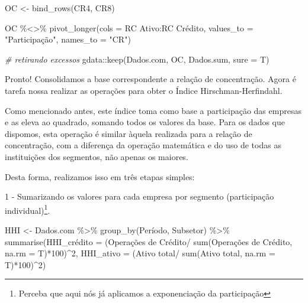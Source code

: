 \documentclass[
]{article}
\newenvironment{Shaded}{\begin{snugshade}}{\end{snugshade}}
\newcommand{\AttributeTok}[1]{\textcolor[rgb]{0.77,0.63,0.00}{#1}}
\newcommand{\CommentTok}[1]{\textcolor[rgb]{0.56,0.35,0.01}{\textit{#1}}}
\newcommand{\DecValTok}[1]{\textcolor[rgb]{0.00,0.00,0.81}{#1}}
\newcommand{\FunctionTok}[1]{\textcolor[rgb]{0.00,0.00,0.00}{#1}}
\newcommand{\NormalTok}[1]{#1}
\newcommand{\OtherTok}[1]{\textcolor[rgb]{0.56,0.35,0.01}{#1}}
\newcommand{\SpecialCharTok}[1]{\textcolor[rgb]{0.00,0.00,0.00}{#1}}
\newcommand{\StringTok}[1]{\textcolor[rgb]{0.31,0.60,0.02}{#1}}
\begin{document}
\begin{Shaded}
\begin{Highlighting}[]
\NormalTok{OC }\OtherTok{\textless{}{-}} \FunctionTok{bind\_rows}\NormalTok{(CR4, CR8)}

\NormalTok{OC }\SpecialCharTok{\%\textless{}\textgreater{}\%} \FunctionTok{pivot\_longer}\NormalTok{(}\AttributeTok{cols =} \StringTok{\textasciigrave{}}\AttributeTok{RC Ativo}\StringTok{\textasciigrave{}}\SpecialCharTok{:}\StringTok{\textasciigrave{}}\AttributeTok{RC Crédito}\StringTok{\textasciigrave{}}\NormalTok{, }
                     \AttributeTok{values\_to =} \StringTok{"Participação"}\NormalTok{, }
                     \AttributeTok{names\_to =} \StringTok{"CR"}\NormalTok{)}

\CommentTok{\# retirando excessos}
\NormalTok{gdata}\SpecialCharTok{::}\FunctionTok{keep}\NormalTok{(Dados.com, OC, Dados.sum, }\AttributeTok{sure =}\NormalTok{ T)}
\end{Highlighting}
\end{Shaded}

Pronto! Consolidamos a base correspondente a relação de concentração.
Agora é tarefa nossa realizar as operações para obter o Índice
Hirschman-Herfindahl.

Como mencionado antes, este índice toma como base a participação das
empresas e as eleva ao quadrado, somando todos os valores da base. Para
os dados que dispomos, esta operação é similar àquela realizada para a
relação de concentração, com a diferença da operação matemática e do uso
de todas as instituições dos segmentos, não apenas os maiores.

Desta forma, realizamos isso em três etapas simples:

1 - Sumarizando os valores para cada empresa por segmento (participação
individual)\footnote{Perceba que aqui nós já aplicamos a exponenciação
  da participação}.

\begin{Shaded}
\begin{Highlighting}[]
\NormalTok{HHI }\OtherTok{\textless{}{-}}\NormalTok{ Dados.com }\SpecialCharTok{\%\textgreater{}\%}
  \FunctionTok{group\_by}\NormalTok{(Período, Subsetor) }\SpecialCharTok{\%\textgreater{}\%}
  \FunctionTok{summarise}\NormalTok{(HHI\_crédito }\OtherTok{=}\NormalTok{ (}\StringTok{\textasciigrave{}}\AttributeTok{Operações de Crédito}\StringTok{\textasciigrave{}}\SpecialCharTok{/}
                            \FunctionTok{sum}\NormalTok{(}\StringTok{\textasciigrave{}}\AttributeTok{Operações de Crédito}\StringTok{\textasciigrave{}}\NormalTok{, }\AttributeTok{na.rm =}\NormalTok{ T)}\SpecialCharTok{*}\DecValTok{100}\NormalTok{)}\SpecialCharTok{\^{}}\DecValTok{2}\NormalTok{,}
            \AttributeTok{HHI\_ativo =}\NormalTok{ (}\StringTok{\textasciigrave{}}\AttributeTok{Ativo total}\StringTok{\textasciigrave{}}\SpecialCharTok{/}
                         \FunctionTok{sum}\NormalTok{(}\StringTok{\textasciigrave{}}\AttributeTok{Ativo total}\StringTok{\textasciigrave{}}\NormalTok{, }\AttributeTok{na.rm =}\NormalTok{ T)}\SpecialCharTok{*}\DecValTok{100}\NormalTok{)}\SpecialCharTok{\^{}}\DecValTok{2}\NormalTok{)}
\end{Highlighting}
\end{Shaded}
\end{document}
